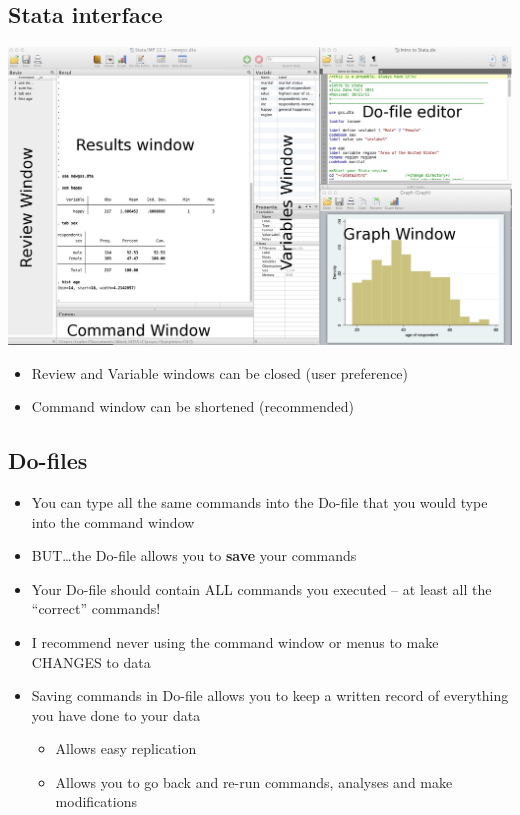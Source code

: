 \documentclass[]{book}
\providecommand{\tightlist}{%
  \setlength{\itemsep}{0pt}\setlength{\parskip}{0pt}}
\begin{document}
\hypertarget{stata-interface}{%
\subsection{Stata interface}\label{stata-interface}}

\includegraphics{Stata/StataIntro/images/StataInterface.png}

\begin{itemize}
\tightlist
\item
  Review and Variable windows can be closed (user preference)
\item
  Command window can be shortened (recommended)
\end{itemize}

\hypertarget{do-files}{%
\subsection{Do-files}\label{do-files}}

\begin{itemize}
\tightlist
\item
  You can type all the same commands into the Do-file that you would type into the command window
\item
  BUT\ldots{}the Do-file allows you to \textbf{save} your commands
\item
  Your Do-file should contain ALL commands you executed -- at least all the ``correct'' commands!
\item
  I recommend never using the command window or menus to make CHANGES to data
\item
  Saving commands in Do-file allows you to keep a written record of everything you have done to your data

  \begin{itemize}
  \tightlist
  \item
    Allows easy replication
  \item
    Allows you to go back and re-run commands, analyses and make modifications
  \end{itemize}
\end{itemize}
\end{document}
